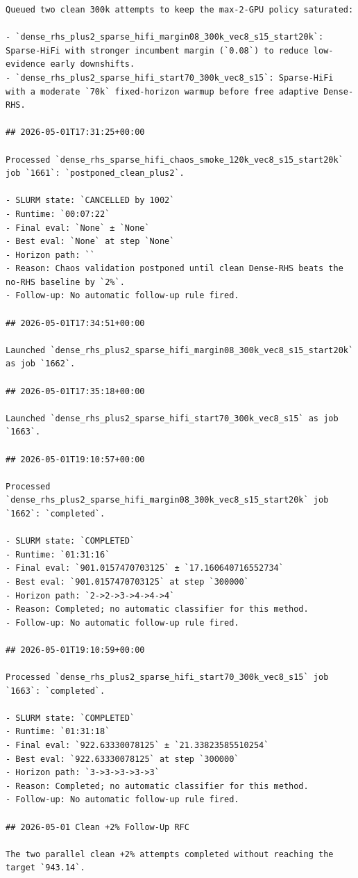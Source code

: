 \begin{verbatim}
Queued two clean 300k attempts to keep the max-2-GPU policy saturated:

- `dense_rhs_plus2_sparse_hifi_margin08_300k_vec8_s15_start20k`: Sparse-HiFi with stronger incumbent margin (`0.08`) to reduce low-evidence early downshifts.
- `dense_rhs_plus2_sparse_hifi_start70_300k_vec8_s15`: Sparse-HiFi with a moderate `70k` fixed-horizon warmup before free adaptive Dense-RHS.

## 2026-05-01T17:31:25+00:00

Processed `dense_rhs_sparse_hifi_chaos_smoke_120k_vec8_s15_start20k` job `1661`: `postponed_clean_plus2`.

- SLURM state: `CANCELLED by 1002`
- Runtime: `00:07:22`
- Final eval: `None` ± `None`
- Best eval: `None` at step `None`
- Horizon path: ``
- Reason: Chaos validation postponed until clean Dense-RHS beats the no-RHS baseline by `2%`.
- Follow-up: No automatic follow-up rule fired.

## 2026-05-01T17:34:51+00:00

Launched `dense_rhs_plus2_sparse_hifi_margin08_300k_vec8_s15_start20k` as job `1662`.

## 2026-05-01T17:35:18+00:00

Launched `dense_rhs_plus2_sparse_hifi_start70_300k_vec8_s15` as job `1663`.

## 2026-05-01T19:10:57+00:00

Processed `dense_rhs_plus2_sparse_hifi_margin08_300k_vec8_s15_start20k` job `1662`: `completed`.

- SLURM state: `COMPLETED`
- Runtime: `01:31:16`
- Final eval: `901.0157470703125` ± `17.160640716552734`
- Best eval: `901.0157470703125` at step `300000`
- Horizon path: `2->2->3->4->4->4`
- Reason: Completed; no automatic classifier for this method.
- Follow-up: No automatic follow-up rule fired.

## 2026-05-01T19:10:59+00:00

Processed `dense_rhs_plus2_sparse_hifi_start70_300k_vec8_s15` job `1663`: `completed`.

- SLURM state: `COMPLETED`
- Runtime: `01:31:18`
- Final eval: `922.63330078125` ± `21.33823585510254`
- Best eval: `922.63330078125` at step `300000`
- Horizon path: `3->3->3->3->3`
- Reason: Completed; no automatic classifier for this method.
- Follow-up: No automatic follow-up rule fired.

## 2026-05-01 Clean +2% Follow-Up RFC

The two parallel clean +2% attempts completed without reaching the target `943.14`.


\end{verbatim}

